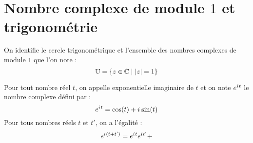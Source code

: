 \section{Nombre complexe de module \(1\) et trigonométrie}
\begin{defi}
	On identifie le cercle trigonométrique et l’ensemble des nombres complexes de module \(1\) que l’on note : \[\mathbb{U} = \left\lbrace z \in \mathbb{C} \;\middle|\; \left\lvert z\right\rvert = 1\right\rbrace\]
\end{defi}

\begin{defprop}
	Pour tout nombre réel \(t\), on appelle exponentielle imaginaire de \(t\) et on note \(e^{i\mkern1mu t}\) le nombre complexe défini par :
	\[e^{i\mkern1mu t} = \cos(t) + i\mkern1mu \sin(t) \]
	Pour tous nombres réels \(t\) et \(t'\), on a l’égalité : \[e^{i\mkern1mu(t+t')} = e^{i\mkern1mu t}e^{i\mkern1mu t'}+ \]
\end{defprop}


